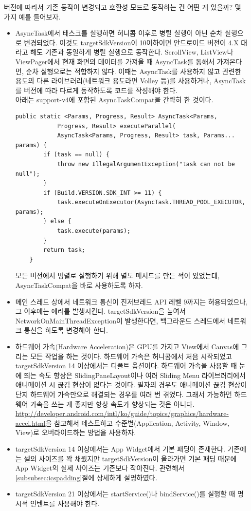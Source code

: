 버전에 따라서 기존 동작이 변경되고 호환성 모드로 동작하는 건 어떤 게 있을까? 몇 가지 예를 들어보자.
\begin{itemize}
\item AsyncTask에서 태스크를 실행하면 허니콤 이후로 병렬 실행이 아닌 순차 실행으로 변경되었다. 이것도 targetSdkVersion이 10이하이면 안드로이드 버전이 4.X 대라고 해도 기존과 동일하게 병렬 실행으로 동작한다. ScrollView, ListView나  ViewPager에서 현재 화면의 데이터를 가져올 때 AsyncTask를 통해서 가져온다면, 순차 실행으로는 적합하지 않다. 이때는  AsyncTask를 사용하지 않고 관련한 용도의 다른 라이브러리(네트워크 용도라면 Volley 등)를 사용하거나, AsyncTask를 버전에 따라 다르게 동작하도록 코드를 작성해야 한다.\\

아래는 support-v4에 포함된 AsyncTaskCompat을 간략히 한 것이다.
\begin{lstlisting}[frame=single]
	public static <Params, Progress, Result> AsyncTask<Params,
			Progress, Result> executeParallel(
            AsyncTask<Params, Progress, Result> task, Params... params) {
        if (task == null) {
            throw new IllegalArgumentException("task can not be null");
        }
        if (Build.VERSION.SDK_INT >= 11) {
            task.executeOnExecutor(AsyncTask.THREAD_POOL_EXECUTOR, params);
        } else {
            task.execute(params);
        }
        return task;
    }
\end{lstlisting}
모든 버전에서 병렬로 실행하기 위해 별도 메서드를 만든 적이 있었는데, AsyncTaskCompat을 바로 사용하도록 하자.

\item 메인 스레드 상에서 네트워크 통신이 진저브레드 API 레벨 9까지는 허용되었으나, 그 이후에는 에러를 발생시킨다. targetSdkVersion을 높여서 NetworkOnMainThreadException이 발생한다면, 백그라운드 스레드에서 네트워크 통신을 하도록 변경해야 한다.
\item 하드웨어 가속(Hardware Acceleration)은 GPU를 가지고 View에서 Canvas에 그리는 모든 작업을 하는 것이다. 하드웨어 가속은 허니콤에서 처음 시작되었고 targetSdkVersion 14 이상에서는 디폴트 옵션이다. 하드웨어 가속을 사용할 때 눈에 띄는 속도 향상은 SlidingPaneLayout이나 여러 Sliding Menu 라이브러리에서 애니메이션 시 끊김 현상이 없다는 것이다. 
필자의 경우도 애니메이션 끊김 현상이 단지 하드웨어 가속만으로 해결되는 경우를 여러 번 겪었다.
그래서 가능하면 하드웨어 가속을 쓰는 게 좋지만 항상 속도가 향상되는 것은 아니다. \url{http://developer.android.com/intl/ko/guide/topics/graphics/hardware-accel.html}을 참고해서 테스트하고 수준별(Application, Activity, Window, View)로 오버라이드하는 방법을 사용하자.

\item targetSdkVersion 14 이상에서는 App Widget에서 기본 패딩이 존재한다. 기존에는 셀의 사이즈를 꽉 채웠지만 targetSdkVersion이 올라가면 기본 패딩 때문에 App Widget의 실제 사이즈는 기존보다 작아진다. 
관련해서 \ref{subsubsec:icspadding}절에 상세하게 설명하였다.

\item targetSdkVersion 21 이상에서는 startService()나 bindService()를 실행할 때 명시적 인텐트를 사용해야 한다.
\end{itemize}


